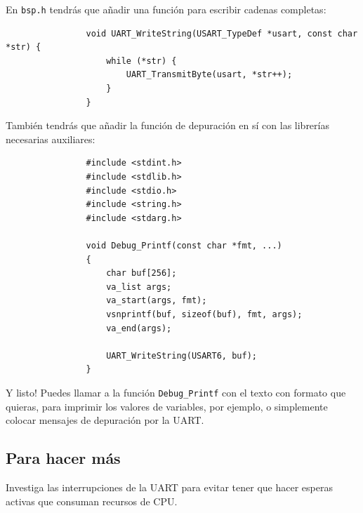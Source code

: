 \documentclass[../main.tex]{subfiles}
\begin{document}
            En \texttt{bsp.h} tendrás que añadir una función para escribir cadenas completas:

            \begin{lstlisting}
                void UART_WriteString(USART_TypeDef *usart, const char *str) {
                    while (*str) {
                        UART_TransmitByte(usart, *str++);
                    }
                }
            \end{lstlisting}

            También tendrás que añadir la función de depuración en sí con las librerías necesarias auxiliares:

            \begin{lstlisting}
                #include <stdint.h>
                #include <stdlib.h>
                #include <stdio.h>
                #include <string.h>
                #include <stdarg.h>

                void Debug_Printf(const char *fmt, ...)
                {
                    char buf[256];
                    va_list args;
                    va_start(args, fmt);
                    vsnprintf(buf, sizeof(buf), fmt, args);
                    va_end(args);

                    UART_WriteString(USART6, buf);
                }
            \end{lstlisting}

            Y listo! Puedes llamar a la función \texttt{Debug\_Printf} con el texto con formato que quieras, para imprimir los valores de variables, por ejemplo, o simplemente colocar mensajes de depuración por la UART.

    \subsection{Para hacer más}

        Investiga las interrupciones de la UART para evitar tener que hacer esperas activas que consuman recursos de CPU. 
\end{document}

